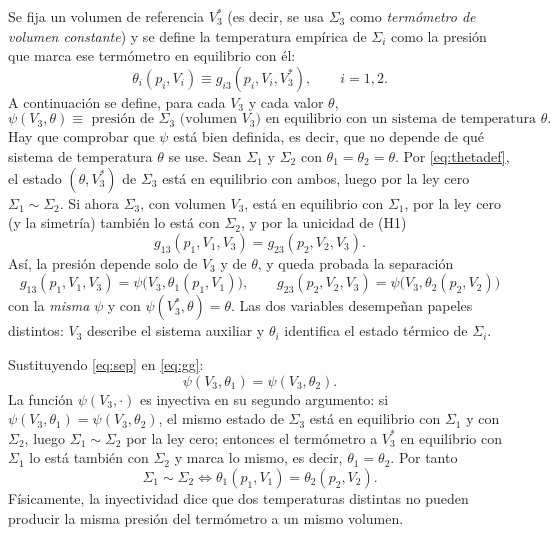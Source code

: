 \begin{demostracion}
 Se fija
un volumen de referencia $V_3^*$ (es decir, se usa $\Sigma_3$ como \emph{termómetro de volumen
constante}) y se define la temperatura empírica de $\Sigma_i$ como la presión que marca ese termómetro
en equilibrio con él:
\begin{equation}\label{eq:thetadef}
  \theta_i(p_i,V_i)\equiv g_{i3}(p_i,V_i,V_3^*),\qquad i=1,2.
\end{equation}
A continuación se define, para cada $V_3$ y cada valor $\theta$,
\begin{equation}\label{eq:psi}
  \psi(V_3,\theta)\equiv\text{ presión de $\Sigma_3$ (volumen $V_3$) en equilibrio con un sistema de temperatura $\theta$.}
\end{equation}
Hay que comprobar que $\psi$ está bien definida, es decir, que no depende de qué sistema de
temperatura $\theta$ se use. Sean $\Sigma_1$ y $\Sigma_2$ con $\theta_1=\theta_2=\theta$. Por
\eqref{eq:thetadef}, el estado $(\theta,V_3^*)$ de $\Sigma_3$ está en equilibrio con ambos, luego por la
ley cero $\Sigma_1\sim\Sigma_2$. Si ahora $\Sigma_3$, con volumen $V_3$, está en equilibrio con
$\Sigma_1$, por la ley cero (y la simetría) también lo está con $\Sigma_2$, y por la unicidad de (H1)
\[
  g_{13}(p_1,V_1,V_3)=g_{23}(p_2,V_2,V_3).
\]
Así, la presión depende solo de $V_3$ y de $\theta$, y queda probada la separación
\begin{equation}\label{eq:sep}
  \boxed{\,g_{13}(p_1,V_1,V_3)=\psi\bigl(V_3,\theta_1(p_1,V_1)\bigr),\qquad
  g_{23}(p_2,V_2,V_3)=\psi\bigl(V_3,\theta_2(p_2,V_2)\bigr)\,}
\end{equation}
con la \emph{misma} $\psi$ y con $\psi(V_3^*,\theta)=\theta$. Las dos variables desempeñan papeles
distintos: $V_3$ describe el sistema auxiliar y $\theta_i$ identifica el estado térmico de $\Sigma_i$.

 Sustituyendo
\eqref{eq:sep} en \eqref{eq:gg}:
\[
  \psi(V_3,\theta_1)=\psi(V_3,\theta_2).
\]
La función $\psi(V_3,\cdot)$ es inyectiva en su segundo argumento: si
$\psi(V_3,\theta_1)=\psi(V_3,\theta_2)$, el mismo estado de $\Sigma_3$ está en equilibrio con $\Sigma_1$
y con $\Sigma_2$, luego $\Sigma_1\sim\Sigma_2$ por la ley cero; entonces el termómetro a $V_3^*$ en
equilibrio con $\Sigma_1$ lo está también con $\Sigma_2$ y marca lo mismo, es decir,
$\theta_1=\theta_2$. Por tanto
\begin{equation}\label{eq:equiv12}
  \boxed{\,\Sigma_1\sim\Sigma_2\iff\theta_1(p_1,V_1)=\theta_2(p_2,V_2).\,}
\end{equation}
Físicamente, la inyectividad dice que dos temperaturas distintas no pueden producir la misma presión
del termómetro a un mismo volumen.


\end{demostracion}
